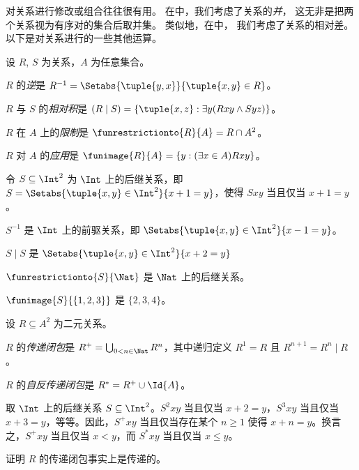 \documentclass[../../../include/open-logic-section]{subfiles}
\begin{document}

对关系进行修改或组合往往很有用。
在中，我们考虑了关系的\emph{并}，
这无非是把两个关系视为有序对的集合后取并集。
类似地，在中，
我们考虑了关系的相对差。
以下是对关系进行的一些其他运算。

\begin{defn}
设 $R$, $S$ 为关系，$A$ 为任意集合。

$R$ 的\emph{逆}是 $R^{-1} = \Setabs{\tuple{y, x}}{\tuple{x,
    y} \in R}$。

$R$ 与 $S$ 的\emph{相对积}是 $(R \mid S) =
\{\tuple{x, z} : \exists y(Rxy \land Syz)\}$。

$R$ 在 $A$ 上的\emph{限制}是 $\funrestrictionto{R}{A}= R
\cap A^2$。

$R$ 对 $A$ 的\emph{应用}是 $\funimage{R}{A} = \{y :
(\exists x \in A)Rxy\}$。
\end{defn}

\begin{ex}
令 $S \subseteq \Int^2$ 为 $\Int$ 上的后继关系，即 $S = \Setabs{\tuple{x, y} \in \Int^2}{x + 1 = y}$，使得 $Sxy$ 当且仅当 $x + 1 = y$。

$S^{-1}$ 是 $\Int$ 上的前驱关系，即 $\Setabs{\tuple{x,y}\in\Int^2}{x -1 =y}$。

$S\mid S$ 是
$ \Setabs{\tuple{x,y}\in\Int^2}{x + 2 =y}$

$\funrestrictionto{S}{\Nat}$ 是 $\Nat$ 上的后继关系。

$\funimage{S}{\{1,2,3\}}$ 是 $\{2, 3, 4\}$。
\end{ex}

\begin{defn}[传递闭包]
设 $R \subseteq A^2$ 为二元关系。

$R$ 的\emph{传递闭包}是 $R^+ = \bigcup_{0 < n \in
\Nat} R^n$，其中递归定义 $R^1 = R$ 且 $R^{n+1} = R^n
\mid R$。

$R$ 的\emph{自反传递闭包}是 $R^* = R^+ \cup
\Id{A}$。
\end{defn}

\begin{ex}
取 $\Int$ 上的后继关系 $S \subseteq \Int^2$。$S^2xy$ 当且仅当 $x + 2 = y$，$S^3xy$ 当且仅当 $x + 3 = y$，等等。因此，$S^+xy$ 当且仅当存在某个 $n \geq 1$ 使得 $x + n = y$。换言之，$S^+xy$ 当且仅当 $x < y$，而 $S^*xy$ 当且仅当 $x \le y$。
\end{ex}

\begin{prob}
证明 $R$ 的传递闭包事实上是传递的。
\end{prob}
\end{document}
